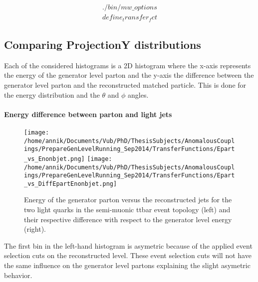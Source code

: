 \begin{eqnarray} \label{eq::TFBuildCmds}
 ./bin/mw\_options \nonumber \\
 define_transfer_fct \nonumber
\end{eqnarray}


\subsection{Comparing ProjectionY distributions}\label{subsubsec::FitRanges}
Each of the considered histograms is a 2D histogram where the x-axis represents the energy of the generator level parton and the y-axis the difference between the generator level parton and the reconstructed matched particle. This is done for the energy distribution and the $\theta$ and $\phi$ angles.


\paragraph{Energy difference between parton and light jets\\}
\begin{figure}[!h]
  \centering
  \texttt{[image: /home/annik/Documents/Vub/PhD/ThesisSubjects/AnomalousCouplings/PrepareGenLevelRunning\_Sep2014/TransferFunctions/Epart\_vs\_Enonbjet.png]}
  \texttt{[image: /home/annik/Documents/Vub/PhD/ThesisSubjects/AnomalousCouplings/PrepareGenLevelRunning\_Sep2014/TransferFunctions/Epart\_vs\_DiffEpartEnonbjet.png]}
  \caption{Energy of the generator parton versus the reconstructed jets for the two light quarks in the semi-muonic ttbar event topology (left) and their respective difference with respect to the generator level energy (right).}
\end{figure}
The first bin in the left-hand histogram is asymetric because of the applied event selection cuts on the reconstructed level. These event selection cuts will not have the same influence on the generator level partons explaining the slight asymetric behavior.
\newpage

